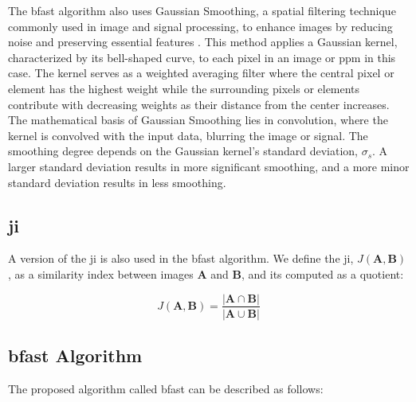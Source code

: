 The \gls{bfast} algorithm also uses Gaussian Smoothing, a spatial filtering technique 
commonly used in image and signal processing, to enhance images by reducing noise and 
preserving essential features \cite{garg2016quality}. This method applies a Gaussian kernel, 
characterized by its bell-shaped curve, to each pixel in an image or \gls{ppm} in this case. 
The kernel serves as a weighted averaging filter where the central pixel or element has the 
highest weight while the surrounding pixels or elements contribute with decreasing weights as 
their distance from the center increases. The mathematical basis of Gaussian Smoothing lies 
in convolution, where the kernel is convolved with the input data, blurring the image or 
signal. The smoothing degree depends on the Gaussian kernel's standard deviation, $\sigma_s$. 
A larger standard deviation results in more significant smoothing, and a more minor standard 
deviation results in less smoothing.

\subsection{\texorpdfstring{\acrlong{ji}}{Jaccard Index}}

A version of the \gls{ji} is also used in the \gls{bfast} algorithm. We define 
the \gls{ji}, $J(\bm{A},\bm{B})$, as a similarity index between images $\bm{A}$ and $\bm{B}$, 
and its computed as a quotient:

\begin{equation}
J(\bm{A},\bm{B}) = \frac{|\bm{A} \cap \bm{B}|}{|\bm{A} \cup \bm{B}|}
\end{equation}

\subsection{\texorpdfstring{\gls{bfast}}{BFAST} Algorithm}

The proposed algorithm called \gls{bfast} can be described as follows:

